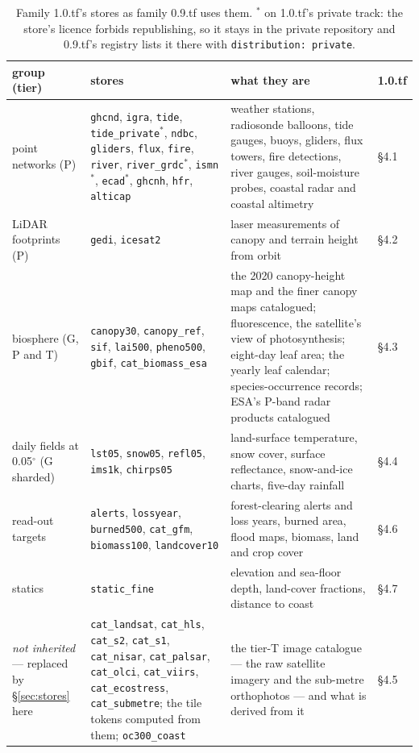 \documentclass[10pt]{article}
\newcommand{\code}[1]{\texttt{#1}}
\begin{document}
\begin{table}[H]
\centering\setlength{\tabcolsep}{3pt}\footnotesize
\begin{tabular}{@{}L{3.3cm}L{5.4cm}L{5.6cm}L{1.3cm}@{}}
\toprule
group (tier) & stores & what they are & 1.0.tf \\
\midrule
point networks (P) & \code{ghcnd}, \code{igra}, \code{tide}, \code{tide\_private}$^{*}$, \code{ndbc}, \code{gliders}, \code{flux}, \code{fire}, \code{river}, \code{river\_grdc}$^{*}$, \code{ismn}$^{*}$, \code{ecad}$^{*}$, \code{ghcnh}, \code{hfr}, \code{alticap} & weather stations, radiosonde balloons, tide gauges, buoys, gliders, flux towers, fire detections, river gauges, soil-moisture probes, coastal radar and coastal altimetry & \S4.1 \\
LiDAR footprints (P) & \code{gedi}, \code{icesat2} & laser measurements of canopy and terrain height from orbit & \S4.2 \\
biosphere (G, P and T) & \code{canopy30}, \code{canopy\_ref}, \code{sif}, \code{lai500}, \code{pheno500}, \code{gbif}, \code{cat\_biomass\_esa} & the 2020 canopy-height map and the finer canopy maps catalogued; fluorescence, the satellite's view of photosynthesis; eight-day leaf area; the yearly leaf calendar; species-occurrence records; ESA's P-band radar products catalogued & \S4.3 \\
daily fields at 0.05$^\circ$ (G sharded) & \code{lst05}, \code{snow05}, \code{refl05}, \code{ims1k}, \code{chirps05} & land-surface temperature, snow cover, surface reflectance, snow-and-ice charts, five-day rainfall & \S4.4 \\
read-out targets & \code{alerts}, \code{lossyear}, \code{burned500}, \code{cat\_gfm}, \code{biomass100}, \code{landcover10} & forest-clearing alerts and loss years, burned area, flood maps, biomass, land and crop cover & \S4.6 \\
statics & \code{static\_fine} & elevation and sea-floor depth, land-cover fractions, distance to coast & \S4.7 \\
\midrule
\emph{not inherited} --- replaced by \S\ref{sec:stores} here & \code{cat\_landsat}, \code{cat\_hls}, \code{cat\_s2}, \code{cat\_s1}, \code{cat\_nisar}, \code{cat\_palsar}, \code{cat\_olci}, \code{cat\_viirs}, \code{cat\_ecostress}, \code{cat\_submetre}; the tile tokens computed from them; \code{oc300\_coast} & the tier-T image catalogue --- the raw satellite imagery and the sub-metre orthophotos --- and what is derived from it & \S4.5 \\
\bottomrule
\end{tabular}
\caption{Family 1.0.tf's stores as family 0.9.tf uses them. $^{*}$ on 1.0.tf's
private track: the store's licence forbids republishing, so it stays in the
private repository and 0.9.tf's registry lists it there with
\code{distribution: private}.}
\end{table}
\end{document}
